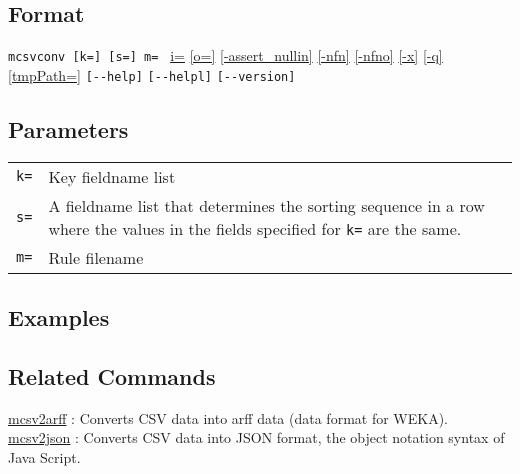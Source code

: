 \subsection*{Format}
\verb/mcsvconv [k=] [s=] m= /
\hyperref[sect:option_i]{i=}
\hyperref[sect:option_o]{[o=]}
\hyperref[sect:option_assert_nullin]{[-assert\_nullin]}
\hyperref[sect:option_nfn]{[-nfn]}
\hyperref[sect:option_nfno]{[-nfno]}
\hyperref[sect:option_x]{[-x]}
\hyperref[sect:option_q]{[-q]}
\hyperref[sect:option_option_tmppath]{[tmpPath=]}
\verb|[--help]|
\verb|[--helpl]|
\verb|[--version]|\\

\subsection*{Parameters}
\begin{table}[htbp]
{\small
\begin{tabular}{ll}
\verb|k=|    & Key fieldname list\\
\verb|s=|    & A fieldname list that determines the sorting sequence in a row where the values in the fields specified for \verb|k=| are the same.\\
\verb|m=|    & Rule filename\\
\end{tabular} 
}
\end{table} 


\subsection*{Examples}


\subsection*{Related Commands}
\hyperref[sect:mcsv2arff]{mcsv2arff} : Converts CSV data into arff data (data format for WEKA).\\
\hyperref[sect:mcsv2json]{mcsv2json} : Converts CSV data into JSON format, the object notation syntax of Java Script.\\

%
